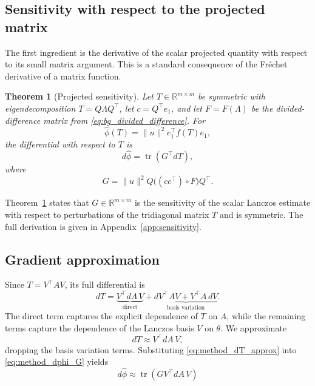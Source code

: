 \documentclass{article}
\newtheorem{theorem}{Theorem}
\begin{document}
\subsection{Sensitivity with respect to the projected matrix}
\label{subsec:method_T_sensitivity}
\label{sec:sensitivity}

The first ingredient is the derivative of the scalar projected quantity with respect to
its small matrix argument. This is a standard consequence of the Fr\'echet derivative of
a matrix function.

\begin{theorem}[Projected sensitivity]
\label{thm:projected_sensitivity}
Let $T\in\mathbb{R}^{m\times m}$ be symmetric with eigendecomposition
$T=Q\Lambda Q^\top$, let $c=Q^\top e_1$, and let $F=F(\Lambda)$ be the
divided-difference matrix from \eqref{eq:bg_divided_difference}. For
\[
    \widehat{\phi}(T)=\|u\|^2 e_1^\top f(T)e_1,
\]
the differential with respect to $T$ is
\begin{equation}
    d\widehat{\phi}
    =
    \operatorname{tr}(G^\top dT),
    \label{eq:method_dphi_G}
\end{equation}
where
\begin{equation}
    G
    =
    \|u\|^2 Q\bigl((cc^\top)\circ F\bigr)Q^\top .
    \label{eq:method_G}
\end{equation}
\end{theorem}

Theorem~\ref{thm:projected_sensitivity} states that $G\in\mathbb{R}^{m\times m}$ is the
sensitivity of the scalar Lanczos estimate with respect to perturbations of the tridiagonal
matrix $T$ and is symmetric. The full derivation is given in Appendix~\ref{app:sensitivity}.

\subsection{Gradient approximation}
\label{subsec:method_gradient_approx}
\label{sec:gm}

Since $T=V^\top A V$, its full differential is
\begin{equation}
    dT
    =
    \underbrace{V^\top dA\,V}_{\text{direct}}
    +
    \underbrace{dV^\top A V + V^\top A\,dV}_{\text{basis variation}} .
    \label{eq:method_dT_full}
\end{equation}
The direct term captures the explicit dependence of $T$ on $A$, while the remaining
terms capture the dependence of the Lanczos basis $V$ on $\theta$. We approximate
\begin{equation}
    dT \approx V^\top dA\,V,
    \label{eq:method_dT_approx}
\end{equation}
dropping the basis variation terms. Substituting \eqref{eq:method_dT_approx} into \eqref{eq:method_dphi_G} yields
\begin{equation}
    d\widehat{\phi}
    \approx
    \operatorname{tr}\!\left(G V^\top dA\,V\right)
    \label{eq:method_grad_approx}
\end{equation}
\end{document}
